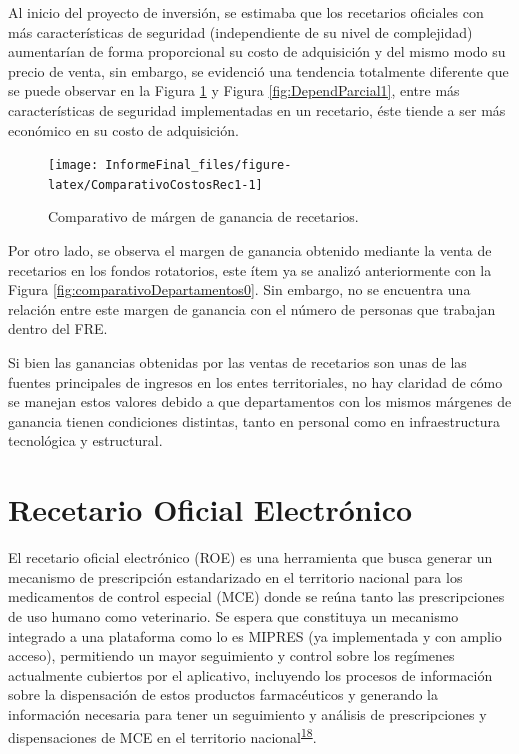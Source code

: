 \documentclass[
  oneside]{book}
\begin{document}
Al inicio del proyecto de inversión, se estimaba que los recetarios oficiales con más características de seguridad (independiente de su nivel de complejidad) aumentarían de forma proporcional su costo de adquisición y del mismo modo su precio de venta, sin embargo, se evidenció una tendencia totalmente diferente que se puede observar en la Figura \ref{fig:ComparativoCostosRec1} y Figura \ref{fig:DependParcial1}, entre más características de seguridad implementadas en un recetario, éste tiende a ser más económico en su costo de adquisición.

\begin{figure}

{\centering \texttt{[image: InformeFinal\_files/figure-latex/ComparativoCostosRec1-1]} 

}

\caption{Comparativo de márgen de ganancia de recetarios.}\label{fig:ComparativoCostosRec1}
\end{figure}

Por otro lado, se observa el margen de ganancia obtenido mediante la venta de recetarios en los fondos rotatorios, este ítem ya se analizó anteriormente con la Figura \ref{fig:comparativoDepartamentos0}. Sin embargo, no se encuentra una relación entre este margen de ganancia con el número de personas que trabajan dentro del FRE.

Si bien las ganancias obtenidas por las ventas de recetarios son unas de las fuentes principales de ingresos en los entes territoriales, no hay claridad de cómo se manejan estos valores debido a que departamentos con los mismos márgenes de ganancia tienen condiciones distintas, tanto en personal como en infraestructura tecnológica y estructural.

\hypertarget{recetario-oficial-electruxf3nico}{%
\section{Recetario Oficial Electrónico}\label{recetario-oficial-electruxf3nico}}

El recetario oficial electrónico (ROE) es una herramienta que busca generar un mecanismo de prescripción estandarizado en el territorio nacional para los medicamentos de control especial (MCE) donde se reúna tanto las prescripciones de uso humano como veterinario. Se espera que constituya un mecanismo integrado a una plataforma como lo es MIPRES (ya implementada y con amplio acceso), permitiendo un mayor seguimiento y control sobre los regímenes actualmente cubiertos por el aplicativo, incluyendo los procesos de información sobre la dispensación de estos productos farmacéuticos y generando la información necesaria para tener un seguimiento y análisis de prescripciones y dispensaciones de MCE en el territorio nacional\textsuperscript{\protect\hyperlink{ref-CuervoBustamante2021}{18}}.
\end{document}
